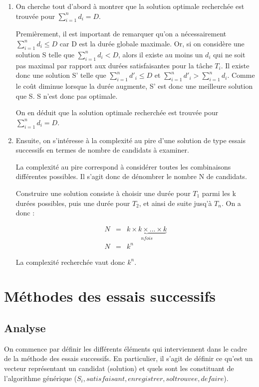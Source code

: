 \documentclass[a4paper, titlepage]{article}
\begin{document}
\begin{enumerate}
\item
	On cherche tout d'abord à montrer que la solution optimale recherchée est trouvée pour $\sum_{i=1}^{n} d_i = D$.

	Premièrement, il est important de remarquer qu'on a nécessairement $\sum_{i=1}^{n} d_i \le D$ car D est la durée globale maximale.
	Or, si on considère une solution S telle que $\sum_{i=1}^{n} d_i < D$, alors il existe au moins un $d_i$ qui ne soit pas maximal par rapport aux durées satisfaisantes pour la tâche $T_i$.
	Il existe donc une solution S' telle que $\sum_{i=1}^{n} d'_i \le D$ et $\sum_{i=1}^{n} d'_i > \sum_{i=1}^{n} d_i$.
	Comme le coût diminue lorsque la durée augmente, S' est donc une meilleure solution que S.
	S n'est donc pas optimale.

	On en déduit que la solution optimale recherchée est trouvée pour $\sum_{i=1}^{n} d_i = D$.

\item
	Ensuite, on s'intéresse à la complexité au pire d'une solution de type essais successifs en termes de nombre de candidats à examiner.

	La complexité au pire correspond à considérer toutes les combinaisons différentes possibles.
	Il s'agit donc de dénombrer le nombre N de candidats.

	Construire une solution consiste à choisir une durée pour $T_1$ parmi les k durées possibles, puis une durée pour $T_2$, et ainsi de suite jusq'à $T_n$.
	On a donc :

	\begin{eqnarray*}
		N & = & \underbrace{k \times k \times ... \times k}_{n fois} \\
		N & = & k^n
	\end{eqnarray*}

	La complexité recherchée vaut donc $k^{n}$.

\end{enumerate}

\section{Méthodes des essais successifs}

	\subsection{Analyse}

		On commence par définir les différents éléments qui interviennent dans le cadre de la méthode des essais successifs.
		En particulier, il s'agit de définir ce qu'est un vecteur représentant un candidat (solution) et quels sont les constituant de l'algorithme générique ($S_{i}, satisfaisant, enregistrer, soltrouvee, defaire$).
\end{document}
